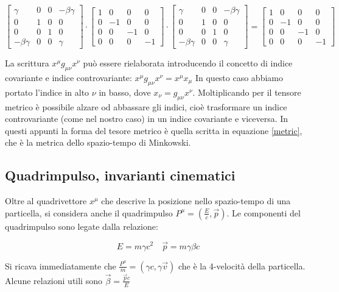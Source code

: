 \documentclass[12pt,a4paper,twoside]{book}
\begin{document}
\[
\begin{bmatrix}
\gamma & 0 & 0 & -\beta \gamma \\ 
0 & 1 & 0 & 0 \\ 
0 & 0 & 1 & 0 \\ 
- \beta \gamma & 0 & 0 & \gamma
\end{bmatrix} 
\cdot 
\begin{bmatrix}
1 & 0 & 0 & 0 \\ 
0 & -1 & 0 & 0 \\ 
0 & 0 & -1 & 0 \\ 
0 & 0 & 0 &-1
\end{bmatrix}
\cdot
\begin{bmatrix}
\gamma & 0 & 0 & -\beta \gamma \\ 
0 & 1 & 0 & 0 \\ 
0 & 0 & 1 & 0 \\ 
- \beta \gamma & 0 & 0 & \gamma
\end{bmatrix} 
=
\begin{bmatrix}
1 & 0 & 0 & 0 \\ 
0 & -1 & 0 & 0 \\ 
0 & 0 & -1 & 0 \\ 
0 & 0 & 0 &-1
\end{bmatrix}
\]

La scrittura $ x^\mu g_{\mu \nu} x^\nu$ può essere rielaborata introducendo il concetto di indice covariante e indice controvariante: $ x^\mu g_{\mu \nu} x^\nu = x^\mu x_\mu$ 
In questo caso abbiamo portato l'indice in alto $\nu$ in basso, dove $x_\nu = g_{\mu \nu} x^\nu$. Moltiplicando per  il tensore metrico è possibile alzare od abbassare gli indici, cioè trasformare un indice controvariante (come nel nostro caso) in un indice covariante e viceversa. In questi appunti la forma del tesore metrico è  quella scritta in equazione \ref{metric}, che è la metrica dello spazio-tempo di Minkowski. 

\subsection{Quadrimpulso, invarianti cinematici}

Oltre al quadrivettore $x^\mu$ che descrive la posizione nello spazio-tempo di una particella, si considera anche il quadrimpulso $P^\mu = (\frac{E}{c}, \vec{p})$. Le componenti del quadrimpulso sono legate dalla relazione:

\begin{equation*}
E = m \gamma c^2 \quad \vec{p} = m \gamma \beta c
\end{equation*}

Si ricava immediatamente che $ \frac{P^\mu}{m} = (\gamma c, \gamma \vec{v})$ che è la 4-velocità della particella. Alcune relazioni utili sono $\vec{\beta} = \frac{\vec{p} c}{E}$
\end{document}
